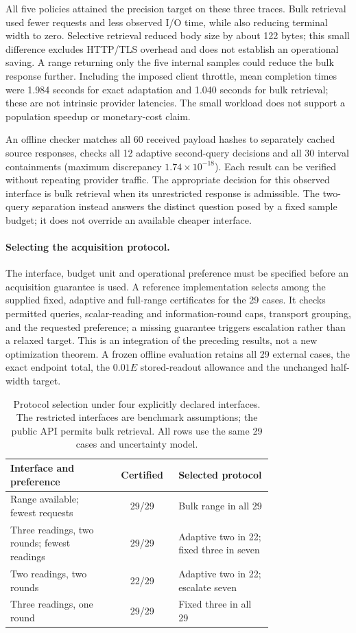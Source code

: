 \documentclass[12pt]{article}
\begin{document}
All five policies attained the precision target on these three traces.
Bulk retrieval used fewer requests and less observed I/O time, while
also reducing terminal width to zero. Selective retrieval reduced body
size by about 122 bytes; this small difference excludes HTTP/TLS overhead
and does not establish an operational saving. A range returning only the
five internal samples could reduce the bulk response further. Including
the imposed client throttle, mean completion times were 1.984 seconds
for exact adaptation and 1.040 seconds for bulk retrieval; these are not
intrinsic provider latencies. The small workload does not support a
population speedup or monetary-cost claim.

An offline checker matches all 60 received payload hashes to separately
cached source responses, checks all 12 adaptive second-query decisions
and all 30 interval containments (maximum discrepancy
$1.74\times10^{-18}$). Each result can be verified without repeating
provider traffic. The appropriate decision for this observed interface
is bulk retrieval when its unrestricted response is admissible. The
two-query separation instead answers the distinct question posed by a
fixed sample budget; it does not override an available cheaper interface.
\FloatBarrier
\paragraph{Selecting the acquisition protocol.}
The interface, budget unit and operational preference must be specified before
an acquisition guarantee is used. A reference implementation selects among
the supplied fixed, adaptive and full-range certificates for the 29 cases.
It checks permitted
queries, scalar-reading and information-round caps, transport grouping, and
the requested preference; a missing guarantee triggers escalation rather than
a relaxed target. This is an integration of the preceding results, not a new
optimization theorem. A frozen offline evaluation retains all 29 external
cases, the exact endpoint total, the $0.01E$ stored-readout allowance and the
unchanged half-width target.

\begin{table}[t]
\centering\small
\caption{Protocol selection under four explicitly declared interfaces. The
restricted interfaces are benchmark assumptions; the public API permits bulk
retrieval. All rows use the same 29 cases and uncertainty model.}
\label{tab:protocol-selection}
\begin{tabular}{p{0.40\linewidth}cp{0.36\linewidth}}
\hline
Interface and preference & Certified & Selected protocol \\
\hline
Range available; fewest requests & 29/29 & Bulk range in all 29 \\
Three readings, two rounds; fewest readings & 29/29 & Adaptive two in 22; fixed three in seven \\
Two readings, two rounds & 22/29 & Adaptive two in 22; escalate seven \\
Three readings, one round & 29/29 & Fixed three in all 29 \\
\hline
\end{tabular}
\end{table}
\end{document}
